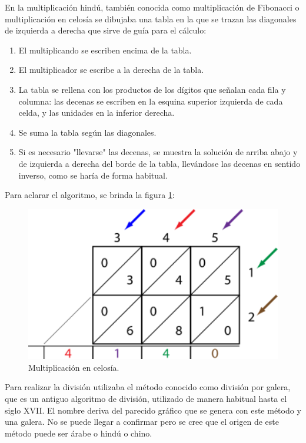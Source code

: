 \documentclass[a4paper, 11pt]{article}
\begin{document}
		En la multiplicación hindú, también conocida como multiplicación de Fibonacci o multiplicación en celosía se
		dibujaba una tabla en la que se trazan las diagonales de izquierda a derecha que sirve de guía para el cálculo:
		\begin{enumerate}
			\item El multiplicando se escriben encima de la tabla.
			\item El multiplicador se escribe a la derecha de la tabla.
			\item La tabla se rellena con los productos de los dígitos que señalan cada fila y columna: las decenas se
			escriben en la esquina superior izquierda de cada celda, y las unidades en la inferior derecha.
			\item Se suma la tabla según las diagonales.
			\item Si es necesario "llevarse" las decenas, se muestra la solución de arriba abajo y de izquierda a derecha
			del borde de la tabla, llevándose las decenas en sentido inverso, como se haría de forma habitual.
		\end{enumerate}

		Para aclarar el algoritmo, se brinda la figura \ref{fig:ind_multiplication}:

		\begin{figure}[!ht]
			\centering
			\includegraphics[width = 14cm]{indian_multiplication.png}
			\caption{Multiplicación en celosía.}
			\label{fig:ind_multiplication}
		\end{figure}
		
		Para realizar la división utilizaba el método conocido como división por galera, que es un antiguo algoritmo de
		división, utilizado de manera habitual hasta el siglo XVII. El nombre deriva del parecido gráfico que se genera
		con este método y una galera. No se puede llegar a confirmar pero se cree que el origen de este método puede ser
		árabe o hindú o chino.
		
\end{document}

